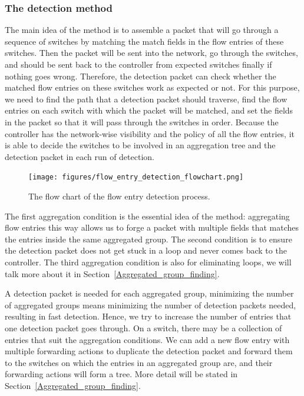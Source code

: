 \documentclass[conference]{IEEEtran}
\begin{document}
\subsubsection{The detection method}
\label{Detection_method}

The main idea of the method is to assemble a packet that will go through a sequence of switches by matching the match fields in the flow entries of these switches. Then the packet will be sent into the network, go through the switches, and should be sent back to the controller from expected switches finally if nothing goes wrong. Therefore, the detection packet can check whether the matched flow entries on these switches work as expected or not. For this purpose, we need to find the path that a detection packet should traverse, find the flow entries on each switch with which the packet will be matched, and set the fields in the packet so that it will pass through the switches in order. Because the controller has the network-wise visibility and the policy of all the flow entries, it is able to decide the switches to be involved in an aggregation tree and the detection packet in each run of detection. 

\begin{figure}[ht]
\centering
\texttt{[image: figures/flow\_entry\_detection\_flowchart.png]}
\caption{The flow chart of the flow entry detection process.}
\label{flow_entry_detection_flowchart}
\end{figure}

The first aggregation condition is the essential idea of the method: aggregating flow entries this way allows us to forge a packet with multiple fields that matches the entries inside the same aggregated group. The second condition is to ensure the detection packet does not get stuck in a loop and never comes back to the controller. The third aggregation condition is also for eliminating loops, we will talk more about it in Section~\ref{Aggregated_group_finding}.

A detection packet is needed for each aggregated group, minimizing the number of aggregated groups means minimizing the number of detection packets needed, resulting in fast detection. Hence, we try to increase the number of entries that one detection packet goes through. On a switch, there may be a collection of entries that suit the aggregation conditions. We can add a new flow entry with multiple forwarding actions to duplicate the detection packet and forward them to the switches on which the entries in an aggregated group are, and their forwarding actions will form a tree. More detail will be stated in Section~\ref{Aggregated_group_finding}.
\end{document}
